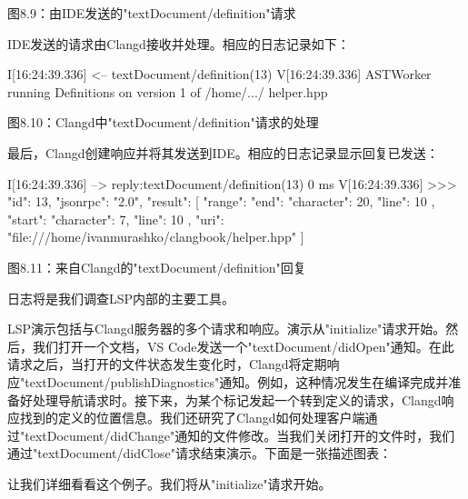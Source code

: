 \begin{center}
图8.9：由IDE发送的"textDocument/definition"请求
\end{center}

IDE发送的请求由Clangd接收并处理。相应的日志记录如下：

\begin{shell}
I[16:24:39.336] <-- textDocument/definition(13)
V[16:24:39.336] ASTWorker running Definitions on version 1 of /home/.../
helper.hpp
\end{shell}


\begin{center}
图8.10：Clangd中"textDocument/definition"请求的处理
\end{center}

最后，Clangd创建响应并将其发送到IDE。相应的日志记录显示回复已发送：

\begin{shell}
I[16:24:39.336] --> reply:textDocument/definition(13) 0 ms
V[16:24:39.336] >>> {
    "id": 13,
    "jsonrpc": "2.0",
    "result": [
    {
        "range": {
            "end": {
                "character": 20,
                "line": 10
            },
            "start": {
                "character": 7,
                "line": 10
            }
        },
        "uri": "file:///home/ivanmurashko/clangbook/helper.hpp"
    }
    ]
}
\end{shell}


\begin{center}
图8.11：来自Clangd的"textDocument/definition"回复
\end{center}

日志将是我们调查LSP内部的主要工具。


LSP演示包括与Clangd服务器的多个请求和响应。演示从"initialize"请求开始。然后，我们打开一个文档，VS Code发送一个"textDocument/didOpen"通知。在此请求之后，当打开的文件状态发生变化时，Clangd将定期响应"textDocument/publishDiagnostics"通知。例如，这种情况发生在编译完成并准备好处理导航请求时。接下来，为某个标记发起一个转到定义的请求，Clangd响应找到的定义的位置信息。我们还研究了Clangd如何处理客户端通过"textDocument/didChange"通知的文件修改。当我们关闭打开的文件时，我们通过"textDocument/didClose"请求结束演示。下面是一张描述图表：


让我们详细看看这个例子。我们将从"initialize"请求开始。


